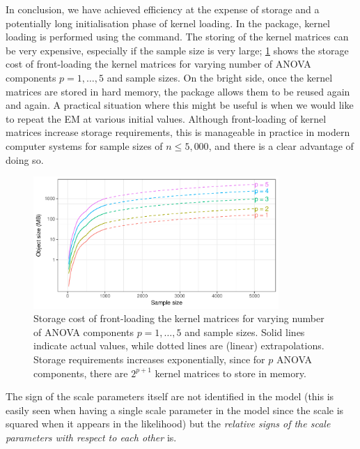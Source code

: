 In conclusion, we have achieved efficiency at the expense of storage and a potentially long initialisation phase of kernel loading.
In the  package, kernel loading is performed using the  command.
The storing of the kernel matrices can be very expensive, especially if the sample size is very large; \cref{fig:ipriorstorage} shows the storage cost of front-loading the kernel matrices for varying number of ANOVA components $p=1,\dots,5$ and sample sizes.
On the bright side, once the kernel matrices are stored in hard memory, the  package allows them to be reused again and again.
A practical situation where this might be useful is when we would like to repeat the EM at various initial values.
Although front-loading of kernel matrices increase storage requirements, this is manageable in practice in modern computer systems for sample sizes of $n \leq 5,000$, and there is a clear advantage of doing so.


\begin{figure}[htb]
  \centering
  \includegraphics[width=0.83\textwidth]{figure/04-iprior_size}
  \caption[Storage cost of front-loading the kernel matrices.]{Storage cost of front-loading the kernel matrices for varying number of ANOVA components $p=1,\dots,5$ and sample sizes. Solid lines indicate actual values, while dotted lines are (linear) extrapolations. Storage requirements increases exponentially, since for $p$ ANOVA components, there are $2^{p+1}$ kernel matrices to store in memory.}
  \label{fig:ipriorstorage}
\end{figure}

\begin{remark}
  The sign of the scale parameters itself are not identified in the model (this is easily seen when having a single scale parameter in the model since the scale is squared when it appears in the likelihood) but the \emph{relative signs of the scale parameters with respect to each other} is.
\end{remark}

